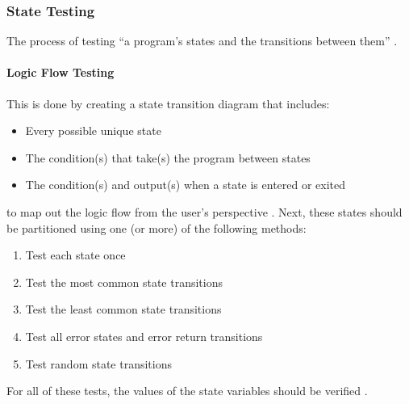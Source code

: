 \subsubsection{State Testing \cite[pp.~79-87]{patton_software_2006}}

The process of testing ``a program's states and the transitions between them''
\cite[p.~79]{patton_software_2006}.

\paragraph{Logic Flow Testing \cite[pp.~80-84]{patton_software_2006}}

This is done by creating a state transition diagram that includes:

\begin{itemize}
      \item Every possible unique state
      \item The condition(s) that take(s) the program between states
      \item The condition(s) and output(s) when a state is entered or exited
\end{itemize}

to map out the logic flow from the user's perspective
\cite[pp.~81-82]{patton_software_2006}. Next, these states should be
partitioned using one (or more) of the following methods:

\begin{enumerate}
      \item Test each state once
      \item Test the most common state transitions
      \item Test the least common state transitions
      \item Test all error states and error return transitions
      \item Test random state transitions
            \cite[pp.~82-83]{patton_software_2006}
\end{enumerate}

For all of these tests, the values of the state variables should be verified
\cite[p.~83]{patton_software_2006}.

